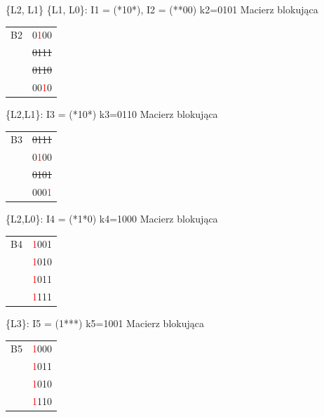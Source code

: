 \documentclass[]{article}
\begin{document}
\newline
\newline
\{L2, L1\} \{L1, L0\}: I1 = (*10*), I2 = (**00)
\newline
\newline
k2=0101
\newline
Macierz blokująca
\newline
\begin{tabular}[r]{|c|c|}
\hline
    B2 & 0\textcolor{red}{1}00 \\
      & \sout{0111} \\
      & \sout{0110} \\
      & 00\textcolor{red}{1}0 \\
\hline 
\end{tabular}
\newline
\newline
\{L2,L1\}: I3 = (*10*)
\newpage
k3=0110
\newline
Macierz blokująca
\newline
\begin{tabular}[r]{|c|c|}
\hline
    B3 & \sout{0111} \\
      & 0\textcolor{red}{1}00 \\
      & \sout{0101} \\
      & 000\textcolor{red}{1} \\
 \hline 
\end{tabular}
\newline
\newline
\{L2,L0\}: I4 = (*1*0)
\newline
\newline
k4=1000
\newline
Macierz blokująca
\newline
\begin{tabular}[r]{|c|c|}
\hline
    B4 & \textcolor{red}{1}001 \\
      & \textcolor{red}{1}010 \\
      & \textcolor{red}{1}011 \\
      & \textcolor{red}{1}111 \\
\hline 
\end{tabular}
\newline
\newline
\{L3\}: I5 = (1***)
\newline
\newline
k5=1001
\newline
Macierz blokująca
\newline
\begin{tabular}[r]{|c|c|}
\hline
    B5 & \textcolor{red}{1}000 \\
      & \textcolor{red}{1}011 \\
      & \textcolor{red}{1}010 \\
      & \textcolor{red}{1}110 \\
\hline 
\end{tabular}
\end{document}
